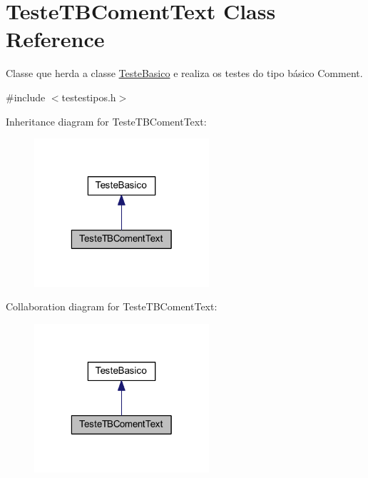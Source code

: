 \hypertarget{class_teste_t_b_coment_text}{\section{Teste\-T\-B\-Coment\-Text Class Reference}
\label{class_teste_t_b_coment_text}
}


Classe que herda a classe \hyperlink{class_teste_basico}{Teste\-Basico} e realiza os testes do tipo básico Comment.  




{\ttfamily \#include $<$testestipos.\-h$>$}



Inheritance diagram for Teste\-T\-B\-Coment\-Text\-:\nopagebreak
\begin{figure}[H]
\begin{center}
\leavevmode
\includegraphics[width=184pt]{class_teste_t_b_coment_text__inherit__graph}
\end{center}
\end{figure}


Collaboration diagram for Teste\-T\-B\-Coment\-Text\-:\nopagebreak
\begin{figure}[H]
\begin{center}
\leavevmode
\includegraphics[width=184pt]{class_teste_t_b_coment_text__coll__graph}
\end{center}
\end{figure}
